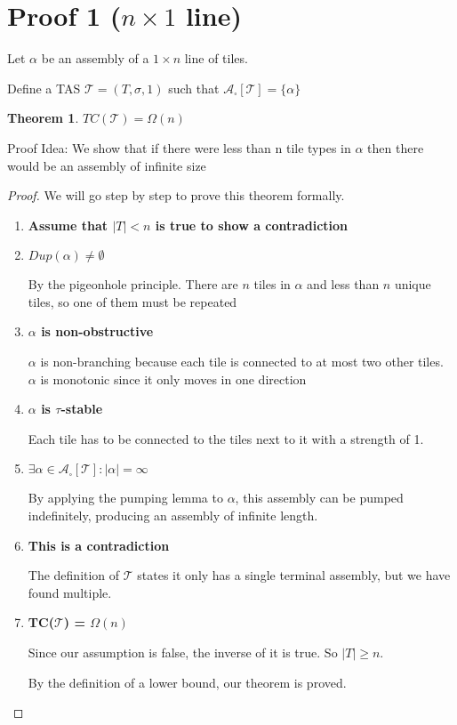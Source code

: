 \documentclass[12pt]{article}
\newtheorem{theorem}{Theorem}
\begin{document}
\section*{Proof 1 ($n \times 1 $ line)}

Let $\alpha$ be an assembly of a $1 \times n$ line of tiles.

Define a TAS $\mathcal{T} = (T, \sigma, 1)$ such that $\mathcal{A}_\square[\mathcal{T}] = \{ \alpha \}$

\begin{theorem}
	$TC(\mathcal{T}) = \Omega(n)$
\end{theorem}

Proof Idea:  We show that if there were less than n tile types in $\alpha$ then there would be an assembly of infinite size

\begin{proof}
	We will go step by step to prove this theorem formally.

	\begin{enumerate}
		\item \textbf{Assume that $|T| < n$ is true to show a contradiction}

		\item \textbf{$Dup(\alpha) \neq \emptyset$}

		By the pigeonhole principle. There are $n$ tiles in $\alpha$ and less than $n$ unique tiles, so one of them must be repeated

		\item \textbf{$\alpha$ is non-obstructive}

            $\alpha$ is non-branching because each tile is connected to at most two other tiles. $\alpha$ is monotonic since it only moves in one direction


        \item \textbf{$\alpha$ is $\tau$-stable}

            Each tile has to be connected to the tiles next to it with a strength of 1. 


		\item \textbf{$\exists \alpha \in \mathcal{A}_\square[\mathcal{T}] : |\alpha| = \infty $}

            By applying the pumping lemma to $\alpha$, this assembly can be pumped indefinitely, producing an assembly of infinite length.

		\item \textbf{This is a contradiction}

		The definition of $\mathcal{T}$ states it only has a single terminal assembly, but we have found multiple.

		\item \textbf{TC($\mathcal{T}$) = $\Omega(n)$}

		Since our assumption is false, the inverse of it is true. So $|T| \geq n$.

		By the definition of a lower bound, our theorem is proved.

	\end{enumerate}
\end{proof}
\end{document}
